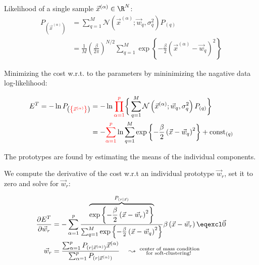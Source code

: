 \begin{frame}{\subsecname}


Likelihood of a single sample $\vec x^{(\alpha)} \in \R^N$:
\begin{align}
P_{(\vec{x}^{(\alpha)})} &= \sum_{q=1}^{M} \mathcal{N}\left( \vec{x}^{(\alpha)}; \vec{w}_q, \sigma_q^2 \right) P_{(q)} \\
&= \frac{1}{M}\left(\frac{\beta}{2\pi}\right)^{N/2} \sum_{q=1}^{M} \exp \left\{ - \frac{\beta}{2} \left( \vec{x}^{(\alpha)} - \vec{w}_q \right)^2 \right\} 
\end{align}

Minimizing the cost w.r.t. to the parameters by mininimizing the nagative data log-likelihood:

\vspace{-2mm}

\begin{align}
E^T = - \ln P_{\left( {\color{red}\left\{ \vec{x}^{(\alpha)} \right\}} \right)} &= -\ln {\color{red}\prod_{\alpha=1}^{p}}
\bigg\{ \sum_{q=1}^{M} \mathcal{N}\left( \vec{x}^{(\alpha)}; \vec{w}_q, \sigma_q^2 \right) P_{(q)}
\bigg\} 
\\&= - {\color{red}\sum_{\alpha=1}^{p}} \ln \sum_{q=1}^{M} \exp \left\{ - \frac{\beta}{2} \left( \vec{x} - \vec{w}_q \right)^2 \right\} + \text{const}_{(q)}
\end{align}

\end{frame}

\begin{frame}{\subsecname}

The prototypes are found by estimating the means of the individual components.

We compute the derivative of the cost w.r.t an individual prototype $\vec w_r$, set it to zero and solve for $\vec w_r$:

\begin{align}
\frac{\partial E^T}{\partial \vec{w}_r} &= - \sum_{\alpha=1}^{p} \frac{\overbrace{\exp \left\{ - \frac{\beta}{2} \left( \vec{x} - \vec{w}_r \right)^2 \right\}}^{P_{(r|\vec x)}}}{\sum_{q=1}^{M} \exp \left\{ - \frac{\beta}{2} \left( \vec{x} - \vec{w}_q \right)^2 \right\}} \beta \left( \vec{x} - \vec{w}_r \right) \eqexcl \vec 0 \\
\vec{w}_r &= \frac{\sum_{\alpha=1}^{p} P_{(r | \vec{x}^{(\alpha)})} \vec{x}^{(\alpha)}}{\sum_{\alpha=1}^{p} P_{(r | \vec{x}^{(\alpha)})}} \quad \leadsto \substack{\text{ center of mass condition}\\\text{for soft-clustering!}}
\end{align}

\end{frame}

